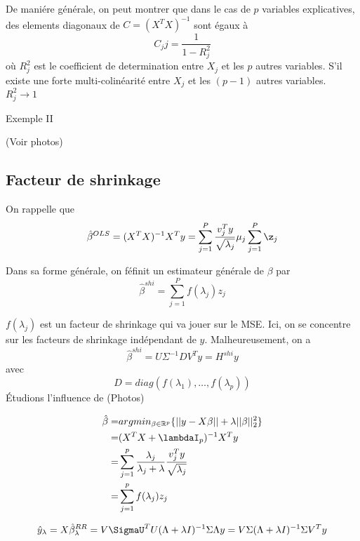 \documentclass{article}
\begin{document}
De mani\'ere g\'en\'erale, on peut montrer que dans le cas de $p$ variables explicatives, des elements diagonaux de $C=(X^TX)^{-1}$ sont \'egaux \`a 
\begin{equation}
C_jj=\frac{1}{1-R_j^2}
\end{equation}
o\`u $R_j^2$ est le coefficient de determination entre $X_j$ et les $p$ autres variables. S'il existe une forte multi-colin\'earit\'e entre $X_j$ et les  $(p-1)$ autres variables. $R_j^2\to 1$

Exemple II

(Voir photos)

\subsection{Facteur de shrinkage}
On rappelle que 
\begin{equation}
\hat{\beta}^{OLS}=(X^TX)^{-1}X^Ty=\sum_{j=1}^{P}\frac{v_j^Ty}{\sqrt{\lambda_j}}\mu_j\sum_{j=1}^{P}\z_j
\end{equation}

Dans sa forme g\'en\'erale, on f\'efinit un estimateur g\'en\'erale de $\beta$ par
\begin{equation}
\hat{\beta}^{shi}=\sum_{j=1}^{P}f(\lambda_j)z_j
\end{equation}

$f(\lambda_j)$ est un facteur de shrinkage qui va jouer sur le MSE. Ici, on se concentre sur les facteurs de shrinkage ind\'ependant de $y$. Malheureusement, on a 
\begin{equation}
\hat{\beta}^{shi}=U\Sigma^{-1}DV^Ty=H^{shi}y
\end{equation}
avec
\begin{equation}
D=diag(f(\lambda_1),\ldots,f(\lambda_p))
\end{equation}
\'Etudions l'influence de 
(Photos)

\begin{equation}
\begin{split}
\hat{\beta}=&argmin_{\beta\in\mathbb{R}^p}\{||y-X\beta||+\lambda||\beta||_2^2\}\\
=&(X^TX+\lambdaI_p)^{-1}X^Ty\\
=&\sum_{j=1}^p\frac{\lambda_j}{\lambda_j+\lambda}\frac{v^T_jy}{\sqrt{\lambda_j}}\\
=&\sum_{j=1}^p f(\lambda_j)z_j
\end{split}
\end{equation}

\begin{equation}
\hat{y}_\lambda=X\hat{\beta}_\lambda^{RR}=V\SigmaU^TU(\Lambda+\lambda I)^{-1}\Sigma\Lambda y=V\Sigma(\Lambda+\lambda I)^{-1}\Sigma V^T y
\end{equation}
\end{document}
